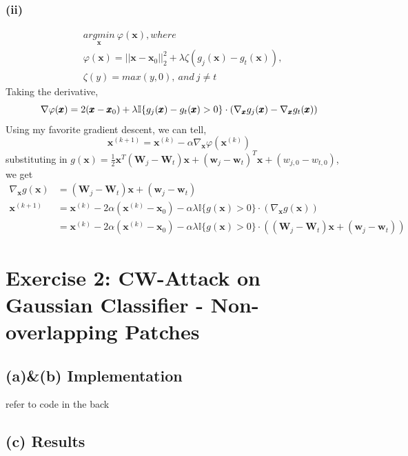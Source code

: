 \documentclass[11pt]{article}
\begin{document}
\subsubsection*{(ii)}
\begin{equation}
\begin{split}
&\underset{\pmb{x}}{argmin}\ \varphi(\pmb{x}), where\\
&\varphi(\pmb{x})=||\pmb{x}-\pmb{x}_0||^2_2+\lambda\zeta(g_j(\pmb{x})-g_t(\pmb{x})),\\
&\zeta(y)=max(y,0),\ and\ j\ne t
\end{split}
\end{equation}
Taking the derivative,
\begin{equation}
\nabla \varphi(\pmb{x}) = 2(\pmb{x}-\pmb{x}_0)+\lambda\mathbb{I}\{g_j(\pmb{x})-g_t(\pmb{x}) > 0\}\cdot(\nabla_{\pmb{x}}g_j(\pmb{x})-\nabla_{\pmb{x}}g_t(\pmb{x}))\\
\end{equation}
Using my favorite gradient descent, we can tell,
\begin{equation}
\pmb{x}^{(k+1)}=\pmb{x}^{(k)}-\alpha\nabla_{\pmb{x}}\varphi(\pmb{x}^{(k)})
\end{equation}
substituting in $g(\pmb{x})=\frac{1}{2}\pmb{x}^T(\pmb{W}_j-\pmb{W}_t)\pmb{x}+(\pmb{w}_j-\pmb{w}_t)^T\pmb{x}+(w_{j,0}-w_{t,0})$,
we get 
\begin{equation}
\begin{split}
\nabla_{\pmb{x}}g(\pmb{x})&=(\pmb{W}_j-\pmb{W}_t)\pmb{x}+(\pmb{w}_j-\pmb{w}_t)\\
\pmb{x}^{(k+1)}&=\pmb{x}^{(k)}-2\alpha(\pmb{x}^{(k)}-\pmb{x}_0)-\alpha\lambda\mathbb{I}\{g(\pmb{x}) > 0\}\cdot(\nabla_{\pmb{x}}g(\pmb{x}))\\
&=\pmb{x}^{(k)}-2\alpha(\pmb{x}^{(k)}-\pmb{x}_0)-\alpha\lambda\mathbb{I}\{g(\pmb{x}) > 0\}\cdot((\pmb{W}_j-\pmb{W}_t)\pmb{x}+(\pmb{w}_j-\pmb{w}_t))
\end{split}
\end{equation}
\section*{Exercise 2: CW-Attack on Gaussian Classifier - Non-overlapping Patches} 
\subsection*{(a)\&(b) Implementation}
refer to code in the back
\subsection*{(c) Results}
\end{document}
